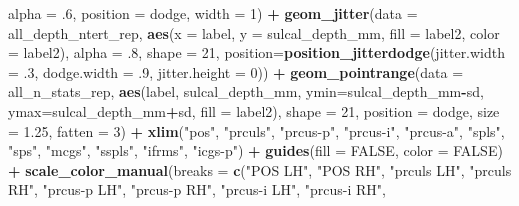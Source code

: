 \documentclass[
]{article}
\newenvironment{Shaded}{\begin{snugshade}}{\end{snugshade}}
\newcommand{\DataTypeTok}[1]{\textcolor[rgb]{0.13,0.29,0.53}{#1}}
\newcommand{\DecValTok}[1]{\textcolor[rgb]{0.00,0.00,0.81}{#1}}
\newcommand{\FloatTok}[1]{\textcolor[rgb]{0.00,0.00,0.81}{#1}}
\newcommand{\KeywordTok}[1]{\textcolor[rgb]{0.13,0.29,0.53}{\textbf{#1}}}
\newcommand{\NormalTok}[1]{#1}
\newcommand{\OperatorTok}[1]{\textcolor[rgb]{0.81,0.36,0.00}{\textbf{#1}}}
\newcommand{\OtherTok}[1]{\textcolor[rgb]{0.56,0.35,0.01}{#1}}
\newcommand{\StringTok}[1]{\textcolor[rgb]{0.31,0.60,0.02}{#1}}
\begin{document}
\begin{Shaded}
\begin{Highlighting}[]
              \DataTypeTok{alpha =} \FloatTok{.6}\NormalTok{, }\DataTypeTok{position =}\NormalTok{ dodge, }\DataTypeTok{width =} \DecValTok{1}\NormalTok{) }\OperatorTok{+}\StringTok{ }
\StringTok{  }\KeywordTok{geom_jitter}\NormalTok{(}\DataTypeTok{data =}\NormalTok{ all_depth_ntert_rep, }\KeywordTok{aes}\NormalTok{(}\DataTypeTok{x =}\NormalTok{ label, }\DataTypeTok{y =}\NormalTok{ sulcal_depth_mm, }\DataTypeTok{fill =}\NormalTok{ label2, }\DataTypeTok{color =}\NormalTok{ label2), }
              \DataTypeTok{alpha =} \FloatTok{.8}\NormalTok{, }\DataTypeTok{shape =} \DecValTok{21}\NormalTok{,}
              \DataTypeTok{position=}\KeywordTok{position_jitterdodge}\NormalTok{(}\DataTypeTok{jitter.width =} \FloatTok{.3}\NormalTok{, }
                                            \DataTypeTok{dodge.width =} \FloatTok{.9}\NormalTok{, }
                                            \DataTypeTok{jitter.height =} \DecValTok{0}\NormalTok{)) }\OperatorTok{+}
\StringTok{  }\KeywordTok{geom_pointrange}\NormalTok{(}\DataTypeTok{data =}\NormalTok{ all_n_stats_rep, }
                  \KeywordTok{aes}\NormalTok{(label, sulcal_depth_mm, }\DataTypeTok{ymin=}\NormalTok{sulcal_depth_mm}\OperatorTok{-}\NormalTok{sd, }\DataTypeTok{ymax=}\NormalTok{sulcal_depth_mm}\OperatorTok{+}\NormalTok{sd, }\DataTypeTok{fill =}\NormalTok{ label2), }
                  \DataTypeTok{shape =} \DecValTok{21}\NormalTok{, }\DataTypeTok{position =}\NormalTok{ dodge, }\DataTypeTok{size =} \FloatTok{1.25}\NormalTok{, }\DataTypeTok{fatten =} \DecValTok{3}\NormalTok{) }\OperatorTok{+}
\StringTok{   }\KeywordTok{xlim}\NormalTok{(}\StringTok{"pos"}\NormalTok{, }\StringTok{"prculs"}\NormalTok{, }\StringTok{"prcus-p"}\NormalTok{, }\StringTok{"prcus-i"}\NormalTok{, }\StringTok{"prcus-a"}\NormalTok{, }\StringTok{"spls"}\NormalTok{, }\StringTok{"sps"}\NormalTok{, }\StringTok{"mcgs"}\NormalTok{, }\StringTok{"sspls"}\NormalTok{, }\StringTok{"ifrms"}\NormalTok{, }\StringTok{"icgs-p"}\NormalTok{) }\OperatorTok{+}
\StringTok{  }\KeywordTok{guides}\NormalTok{(}\DataTypeTok{fill =} \OtherTok{FALSE}\NormalTok{, }\DataTypeTok{color =} \OtherTok{FALSE}\NormalTok{) }\OperatorTok{+}
\StringTok{  }\KeywordTok{scale_color_manual}\NormalTok{(}\DataTypeTok{breaks =} 
                       \KeywordTok{c}\NormalTok{(}\StringTok{"POS LH"}\NormalTok{, }\StringTok{"POS RH"}\NormalTok{,}
                         \StringTok{"prculs LH"}\NormalTok{, }\StringTok{"prculs RH"}\NormalTok{,}
                         \StringTok{"prcus-p LH"}\NormalTok{, }\StringTok{"prcus-p RH"}\NormalTok{,}
                         \StringTok{"prcus-i LH"}\NormalTok{, }\StringTok{"prcus-i RH"}\NormalTok{,}

\end{Highlighting}
\end{Shaded}
\end{document}
